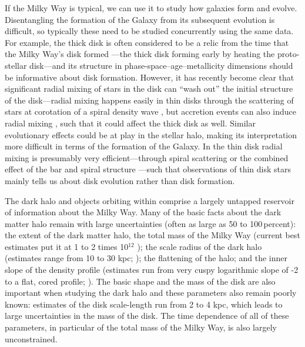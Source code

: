 If the Milky Way is typical, we can use it to study how galaxies form
and evolve. Disentangling the formation of the Galaxy from its
subsequent evolution is difficult, so typically these need to be
studied concurrently using the same data. For example, the thick disk
is often considered to be a relic from the time that the Milky Way's
disk formed \citep{Freeman02a}---the thick disk forming early by
heating the proto-stellar disk---and its structure in
phase-space--age--metallicity dimensions should be informative about
disk formation. However, it has recently become clear that significant
radial mixing of stars in the disk can ``wash out'' the initial
structure of the disk---radial mixing happens easily in thin disks
through the scattering of stars at corotation of a spiral density wave
\citep{sellwood02a}, but accretion events can also induce radial
mixing \citep{Quillen09a}, such that it could affect the thick disk as
well. Similar evolutionary effects could be at play in the stellar
halo, making its interpretation more difficult in terms of the
formation of the Galaxy. In the thin disk radial mixing is presumably
very efficient---through spiral scattering or the combined effect of
the bar and spiral structure \citep{sellwood02a,Minchev09b}---such
that observations of thin disk stars mainly tells us about disk
evolution rather than disk formation.

The dark halo and objects orbiting within comprise a largely untapped
reservoir of information about the Milky Way. Many of the basic facts
about the dark matter halo remain with large uncertainties (often as
large as 50 to 100\,percent): the extent of the dark matter halo, the
total mass of the Milky Way (current best estimates put it at 1 to 2
times 10$^{12}$ \Msol); the scale radius of the dark halo (estimates
range from 10 to 30 kpc; \citealt{Smith07a,Xue08a}); the flattening of
the halo; and the inner slope of the density profile (estimates run
from very cuspy logarithmic slope of -2 to a flat, cored
profile; \citealt{2008gady.book.....B}). The basic shape and the mass
of the disk are also important when studying the dark halo and these
parameters also remain poorly known: estimates of the disk
scale-length run from 2 to 4 kpc, which leads to large uncertainties
in the mass of the disk. The time dependence of all of these
parameters, in particular of the total mass of the Milky Way, is also
largely unconstrained.

